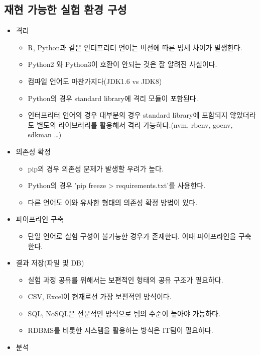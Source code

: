 \documentclass{article}
\begin{document}
\subsection{재현 가능한 실험 환경 구성}
\begin{itemize}
    \item 격리
    \begin{itemize}
        \item R, Python과 같은 인터프리터 언어는 버전에 따른 명세 차이가 발생한다.
        \item Python2 와 Python3이 호환이 안되는 것은 잘 알려진 사실이다.
        \item 컴파일 언어도 마찬가지다(JDK1.6 vs JDK8)
        \item Python의 경우 standard library에 격리 모듈이 포함된다.
        \item 인터프리터 언어의 경우 대부분의 경우 standard library에 포함되지 않았더라도 별도의 라이브러리를 활용해서 격리 가능하다.(nvm, rbenv, goenv, sdkman \ldots)
    \end{itemize}
    \item 의존성 확정
        \begin{itemize}
        \item pip의 경우 의존성 문제가 발생할 우려가 높다.
        \item Python의 경우 'pip freeze > requirements.txt'를 사용한다.
        \item 다른 언어도 이와 유사한 형태의 의존성 확정 방법이 있다.
    \end{itemize}
    \item 파이프라인 구축
        \begin{itemize}
        \item 단일 언어로 실험 구성이 불가능한 경우가 존재한다. 이때 파이프라인을 구축한다.
    \end{itemize}
    \item 결과 저장(파일 및 DB)
        \begin{itemize}
        \item 실험 과정 공유를 위해서는 보편적인 형태의 공유 구조가 필요하다.
        \item CSV, Excel이 현재로선 가장 보편적인 방식이다.
        \item SQL, NoSQL은 전문적인 방식으로 팀의 수준이 높아야 가능하다.
        \item RDBMS를 비롯한 시스템을 활용하는 방식은 IT팀이 필요하다.
    \end{itemize}
    \item 분석
        \begin{itemize}

\end{itemize}
\end{itemize}
\end{document}

